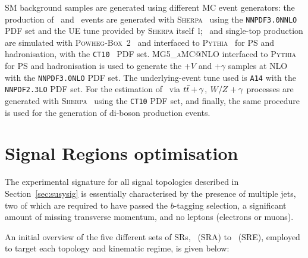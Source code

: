 			\ac{SM} background samples are generated using different \ac{MC} event generators: the production of \Zjets\ and \Wjets\ events are generated with \textsc{Sherpa}~\cite{Sherpa} using the \verb+NNPDF3.0NNLO+~\cite{PDFs} \ac{PDF} set and the \ac{UE} tune provided by \textsc{Sherpa} itself~\cite{Sherpa}l; \ttbar\ and single-top production are simulated with \textsc{Powheg-Box}~2~\cite{powheg-box} and interfaced to \textsc{Pythia}~\cite{Pythia2006} for \ac{PS} and hadronisation, with the \verb+CT10+~\cite{CT10} \ac{PDF} set. {\scshape MG5\_aMC\/@NLO} interfaced to \textsc{Pythia} for \ac{PS} and hadronisation is used to generate the \ttbar+$V$ and \ttbar+$\gamma$ samples at \ac{NLO} with the \verb+NNPDF3.0NLO+ \ac{PDF} set. The underlying-event tune used is \verb+A14+ with the \verb+NNPDF2.3LO+ \ac{PDF} set. For the estimation of \ttZ\ via $t\bar{t}+\gamma$, $W/Z+\gamma$ processes are generated with \textsc{Sherpa}~\cite{Sherpa} using the \verb+CT10+ \ac{PDF} set, and finally, the same procedure is used for the generation of di-boson production events.


	\section{Signal Regions optimisation}
	\label{sec:SRs}

		The experimental signature for all signal topologies described in Section~\ref{sec:susysig} is essentially characterised by the presence of multiple jets, two of which are required to have passed the $b$-tagging selection, a significant amount of missing transverse momentum, and no leptons (electrons or muons).

		An initial overview of the five different sets of \acp{SR}, \SRA\ (SRA) to \SRE\ (SRE), employed to target each topology and kinematic regime, is given below: 
		

